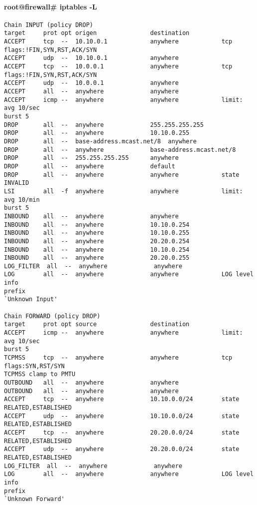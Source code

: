 \documentclass[a4paper,12pt]{report}
\newenvironment{myscriptlisting}
{\begin{list}{}{\setlength{\leftmargin}{1em}}\item\scriptsize\bfseries}
{\end{list}}
\begin{document}
\paragraph{root@firewall\# iptables -L}
\begin{myscriptlisting}
\begin{verbatim}
Chain INPUT (policy DROP)
target     prot opt origen               destination         
ACCEPT     tcp  --  10.10.0.1            anywhere            tcp
flags:!FIN,SYN,RST,ACK/SYN 
ACCEPT     udp  --  10.10.0.1            anywhere            
ACCEPT     tcp  --  10.0.0.1             anywhere            tcp
flags:!FIN,SYN,RST,ACK/SYN 
ACCEPT     udp  --  10.0.0.1             anywhere            
ACCEPT     all  --  anywhere             anywhere            
ACCEPT     icmp --  anywhere             anywhere            limit: avg 10/sec
burst 5 
DROP       all  --  anywhere             255.255.255.255     
DROP       all  --  anywhere             10.10.0.255         
DROP       all  --  base-address.mcast.net/8  anywhere            
DROP       all  --  anywhere             base-address.mcast.net/8 
DROP       all  --  255.255.255.255      anywhere            
DROP       all  --  anywhere             default             
DROP       all  --  anywhere             anywhere            state INVALID 
LSI        all  -f  anywhere             anywhere            limit: avg 10/min
burst 5 
INBOUND    all  --  anywhere             anywhere            
INBOUND    all  --  anywhere             10.10.0.254         
INBOUND    all  --  anywhere             10.10.0.255         
INBOUND    all  --  anywhere             20.20.0.254         
INBOUND    all  --  anywhere             10.10.0.254         
INBOUND    all  --  anywhere             20.20.0.255         
LOG_FILTER  all  --  anywhere             anywhere            
LOG        all  --  anywhere             anywhere            LOG level info
prefix
`Unknown Input' 

Chain FORWARD (policy DROP)
target     prot opt source               destination         
ACCEPT     icmp --  anywhere             anywhere            limit: avg 10/sec
burst 5 
TCPMSS     tcp  --  anywhere             anywhere            tcp
flags:SYN,RST/SYN
TCPMSS clamp to PMTU 
OUTBOUND   all  --  anywhere             anywhere            
OUTBOUND   all  --  anywhere             anywhere            
ACCEPT     tcp  --  anywhere             10.10.0.0/24        state
RELATED,ESTABLISHED 
ACCEPT     udp  --  anywhere             10.10.0.0/24        state
RELATED,ESTABLISHED 
ACCEPT     tcp  --  anywhere             20.20.0.0/24        state
RELATED,ESTABLISHED 
ACCEPT     udp  --  anywhere             20.20.0.0/24        state
RELATED,ESTABLISHED 
LOG_FILTER  all  --  anywhere             anywhere            
LOG        all  --  anywhere             anywhere            LOG level info
prefix
`Unknown Forward' 


\end{verbatim}
\end{myscriptlisting}
\end{document}

